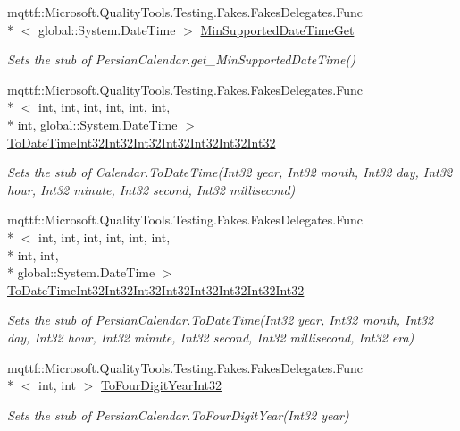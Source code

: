 \begin{DoxyCompactItemize}
mqttf\-::\-Microsoft.\-Quality\-Tools.\-Testing.\-Fakes.\-Fakes\-Delegates.\-Func\\*
$<$ global\-::\-System.\-Date\-Time $>$ \hyperlink{class_system_1_1_globalization_1_1_fakes_1_1_stub_persian_calendar_a806cc6ba27d019fe5e1fea5c21f98923}{Min\-Supported\-Date\-Time\-Get}
\begin{DoxyCompactList}\small\item\em Sets the stub of Persian\-Calendar.\-get\-\_\-\-Min\-Supported\-Date\-Time()\end{DoxyCompactList}\item 
mqttf\-::\-Microsoft.\-Quality\-Tools.\-Testing.\-Fakes.\-Fakes\-Delegates.\-Func\\*
$<$ int, int, int, int, int, int, \\*
int, global\-::\-System.\-Date\-Time $>$ \hyperlink{class_system_1_1_globalization_1_1_fakes_1_1_stub_persian_calendar_a645703f04fc140cbdd9e574ba7a401a7}{To\-Date\-Time\-Int32\-Int32\-Int32\-Int32\-Int32\-Int32\-Int32}
\begin{DoxyCompactList}\small\item\em Sets the stub of Calendar.\-To\-Date\-Time(\-Int32 year, Int32 month, Int32 day, Int32 hour, Int32 minute, Int32 second, Int32 millisecond)\end{DoxyCompactList}\item 
mqttf\-::\-Microsoft.\-Quality\-Tools.\-Testing.\-Fakes.\-Fakes\-Delegates.\-Func\\*
$<$ int, int, int, int, int, int, \\*
int, int, \\*
global\-::\-System.\-Date\-Time $>$ \hyperlink{class_system_1_1_globalization_1_1_fakes_1_1_stub_persian_calendar_a6cac99f788a742614c5896361c775e58}{To\-Date\-Time\-Int32\-Int32\-Int32\-Int32\-Int32\-Int32\-Int32\-Int32}
\begin{DoxyCompactList}\small\item\em Sets the stub of Persian\-Calendar.\-To\-Date\-Time(\-Int32 year, Int32 month, Int32 day, Int32 hour, Int32 minute, Int32 second, Int32 millisecond, Int32 era)\end{DoxyCompactList}\item 
mqttf\-::\-Microsoft.\-Quality\-Tools.\-Testing.\-Fakes.\-Fakes\-Delegates.\-Func\\*
$<$ int, int $>$ \hyperlink{class_system_1_1_globalization_1_1_fakes_1_1_stub_persian_calendar_aa33e394768879c97dc47cd437a030a28}{To\-Four\-Digit\-Year\-Int32}
\begin{DoxyCompactList}\small\item\em Sets the stub of Persian\-Calendar.\-To\-Four\-Digit\-Year(\-Int32 year)\end{DoxyCompactList}\item 

\end{DoxyCompactItemize}
